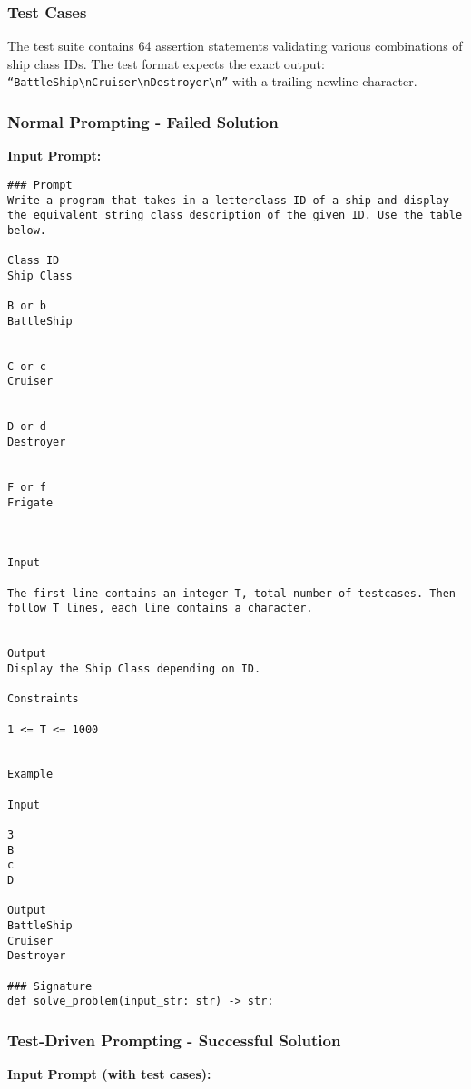 \documentclass{article}
\begin{document}
\subsubsection{Test Cases}
The test suite contains 64 assertion statements validating various combinations of ship class IDs. The test format expects the exact output: \texttt{``BattleShip\textbackslash nCruiser\textbackslash nDestroyer\textbackslash n''} with a trailing newline character.

\subsubsection{Normal Prompting - Failed Solution}

\textbf{Input Prompt:}

\begin{lstlisting}
### Prompt
Write a program that takes in a letterclass ID of a ship and display the equivalent string class description of the given ID. Use the table below.

Class ID
Ship Class

B or b
BattleShip


C or c
Cruiser


D or d
Destroyer


F or f
Frigate



Input

The first line contains an integer T, total number of testcases. Then follow T lines, each line contains a character.


Output
Display the Ship Class depending on ID.

Constraints

1 <= T <= 1000


Example

Input

3
B
c
D

Output
BattleShip
Cruiser
Destroyer

### Signature
def solve_problem(input_str: str) -> str:
\end{lstlisting}

\subsubsection{Test-Driven Prompting - Successful Solution}

\textbf{Input Prompt (with test cases):}
\end{document}
